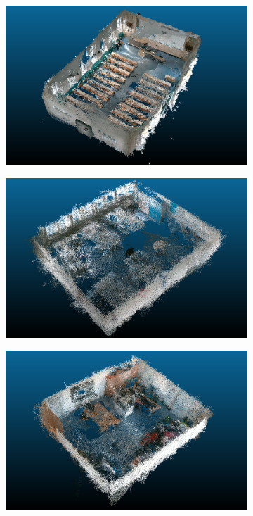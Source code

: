 \documentclass[main.tex]{subfiles}
\begin{document}
\begin{figure}[H]
    \begin{subfigure}{0.5\textwidth}
        \centering
        \includegraphics[width=.9\linewidth]{images/307.png}
        \caption[Dynamic Dataset - auditorium]{}
        \label{fig:fin307}
    \end{subfigure}
    \begin{subfigure}{0.5\textwidth}
        \centering
        \includegraphics[width=.9\linewidth]{images/333.png}
        \caption[Dynamic Dataset - conference room]{}
        \label{fig:fin333}
    \end{subfigure}
    \begin{subfigure}{0.5\textwidth}
        \centering
        \includegraphics[width=0.9\linewidth]{images/425.png}

\end{subfigure}
\end{figure}
\end{document}
